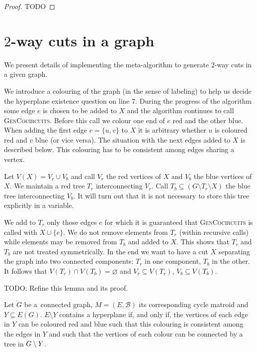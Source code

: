 \begin{proof}
	TODO
\end{proof}

\section{$2$-way cuts in a graph}

We present details of implementing the meta-algorithm to generate $2$-way cuts in a given graph.

We introduce a colouring of the graph (in the sense of labeling) to help us decide the hyperplane existence question on line 7. During the progress of the algorithm some edge $e$ is chosen to be added to $X$ and the algorithm continues to call \textsc{GenCocircuits}. Before this call we colour one end of $e$ red and the other blue. When adding the first edge $e = \{u ,v\}$ to $X$ it is arbitrary whether $u$ is coloured red and $v$ blue (or vice versa). The situation with the next edges added to $X$ is described below. This colouring has to be consistent among edges sharing a vertex.

Let $V(X) = V_r \cup V_b$ and call $V_r$ the red vertices of $X$ and $V_b$ the blue vertices of $X$. We maintain a red tree $T_r$ interconnecting $V_r$. Call ${T_b \subseteq (G \setminus T_r \setminus X)}$ the blue tree interconnecting $V_b$. It will turn out that it is not necessary to store this tree explicitly in a variable.

We add to $T_r$ only those edges $e$ for which it is guaranteed that \textsc{GenCocircuits} is called with $X \cup \{e\}$. We do not remove elements from $T_r$ (within recursive calls) while elements may be removed from $T_b$ and added to $X$. This shows that $T_r$ and $T_b$ are not treated symmetrically. In the end we want to have a cut $X$ separating the graph into two connected components: $T_r$ in one component, $T_b$ in the other. It follows that $V(T_r) \cap V(T_b) = \varnothing$ and $V_r \subseteq V(T_r)$, $V_b \subseteq V(T_b)$.


TODO: Refine this lemma and its proof.

\begin{lem}
	\label{lem:hyperplane_existence}
	Let $G$ be a~connected graph, $M = (E, \mathcal{B})$ its corresponding cycle matroid and $Y \subseteq E(G)$. $E \setminus Y$ contains a hyperplane if, and only if, the vertices of each edge in $Y$ can be coloured red and blue such that this colouring is consistent among the edges in $Y$ and such that the vertices of each colour can be connected by a tree in $G \setminus Y$.
\end{lem}


